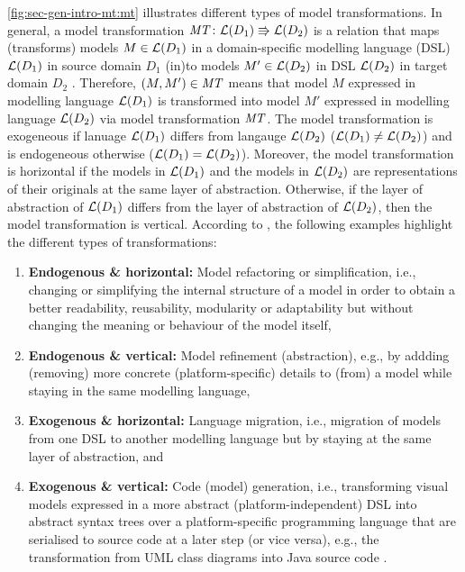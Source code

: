\cref{fig:sec-gen-intro-mt:mt} illustrates different types of model transformations.
In general, a model transformation $\mathit{MT}\colon \mathcal{L}(D_1) \Rrightarrow \mathcal{L}(D_2)$ is a relation that maps (transforms) models $M \in \mathcal{L}(D_1)$ in a domain-specific modelling language (DSL) $\mathcal{L}(D_1)$ in source domain $D_1$ (in)to models $M' \in \mathcal{L}(D_2)$ in DSL $\mathcal{L}(D_2)$ in target domain $D_2$ \cite{Mens2006125}.
Therefore, $(M,M') \in \mathit{MT}$ means that model $M$ expressed in modelling language $\mathcal{L}(D_1)$ is transformed into model $M'$ expressed in modelling language $\mathcal{L}(D_2)$ via model transformation $\mathit{MT}$.
The model transformation is exogeneous if lanuage $\mathcal{L}(D_1)$ differs from langauge $\mathcal{L}(D_2)$ ($\mathcal{L}(D_1) \neq \mathcal{L}(D_2)$) and is endogeneous otherwise ($\mathcal{L}(D_1)=\mathcal{L}(D_2)$).
Moreover, the model transformation is horizontal if the models in $\mathcal{L}(D_1)$ and the models in $\mathcal{L}(D_2)$ are representations of their originals at the same layer of abstraction.
Otherwise, if the layer of abstraction of $\mathcal{L}(D_1)$ differs from the layer of abstraction of $\mathcal{L}(D_2)$, then the model transformation is vertical.
According to \cite{Mens2006125}, the following examples highlight the different types of transformations:
\begin{enumerate}
  \item \textbf{Endogenous \& horizontal:} Model refactoring or simplification, i.e., changing or simplifying the internal structure of a model in order to obtain a better readability, reusability, modularity or adaptability but without changing the meaning or behaviour of the model itself,
  \item \textbf{Endogenous \& vertical:} Model refinement (abstraction), e.g., by addding (removing) more concrete (platform-specific) details to (from) a model while staying in the same modelling language,
  \item \textbf{Exogenous \& horizontal:} Language migration, i.e., migration of models from one DSL to another modelling language but by staying at the same layer of abstraction, and
  \item \textbf{Exogenous \& vertical:} Code (model) generation, i.e., transforming visual models expressed in a more abstract (platform-independent) DSL into abstract syntax trees over a platform-specific programming language that are serialised to source code at a later step (or vice versa), e.g., the transformation from UML class diagrams into Java source code \cite{Czarnecki:2006:FSM:1165093.1165106}.
\end{enumerate}

